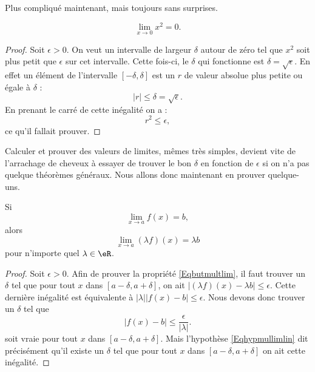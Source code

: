 Plus compliqué maintenant, mais toujours sans surprises.

\begin{proposition}
\[ 
  \lim_{x\to 0}x^2=0.
\]

\end{proposition}

\begin{proof}
Soit $\epsilon>0$. On veut un intervalle de largeur $\delta$ autour de zéro tel que $x^2$ soit plus petit que $\epsilon$ sur cet intervalle. Cette fois-ci, le $\delta$ qui fonctionne est $\delta=\sqrt{\epsilon}$. En effet un élément de l'intervalle $[-\delta,\delta]$ est un $r$ de valeur absolue plus petite ou égale à $\delta$ : 
\[ 
| r |\leq\delta=\sqrt{\epsilon}.
\]
En prenant le carré de cette inégalité on a :
\[ 
  r^2\leq\epsilon,
\]
ce qu'il fallait prouver.
\end{proof}


Calculer et prouver des valeurs de limites, mêmes très simples, devient vite de l'arrachage de cheveux à essayer de trouver le bon $\delta$ en fonction de $\epsilon$ si on n'a pas quelque théorèmes généraux. Nous allons donc maintenant en prouver quelque-uns.

\begin{theorem}     \label{ThoLimLinMul}
    Si
    \begin{equation} \label{Eqhypmullimlin}
      \lim_{x\to a}f(x)=b,
    \end{equation}
    alors
    \begin{equation} \label{Eqbutmultlim}
      \lim_{x\to a}(\lambda f)(x)=\lambda b
    \end{equation}
    pour n'importe quel $\lambda\in\eR$.
\end{theorem}

\begin{proof}
Soit $\epsilon>0$. Afin de prouver la propriété \eqref{Eqbutmultlim}, il faut trouver un $\delta$ tel que pour tout $x$ dans $[a-\delta,a+\delta]$, on ait $| (\lambda f)(x)- \lambda b |\leq\epsilon$. Cette dernière inégalité est équivalente à $|\lambda|| f(x)-b |\leq\epsilon$. Nous devons donc trouver un $\delta$ tel que 
\begin{equation} 
| f(x)-b |\leq\frac{ \epsilon }{ | \lambda | }.
\end{equation}
soit vraie pour tout $x$ dans $[a-\delta,a+\delta]$. Mais l'hypothèse \eqref{Eqhypmullimlin} dit précisément qu'il existe un $\delta$ tel que pour tout $x$ dans $[a-\delta,a+\delta]$ on ait cette inégalité. 
\end{proof}

